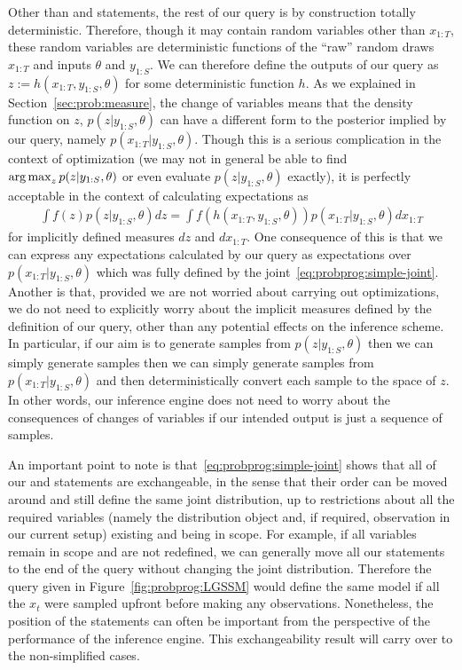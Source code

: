 Other than \sample and \observe statements, the rest of our query is by construction totally deterministic.  Therefore,
though it may contain random variables other than $x_{1:T}$, these random variables are deterministic
functions of the ``raw'' random draws $x_{1:T}$ and inputs $\theta$ and $y_{1:S}$.  We can therefore 
define the outputs of our query as $z := h(x_{1:T},y_{1:S},\theta)$ for some deterministic function $h$.
As we explained in Section~\ref{sec:prob:measure}, the change of variables means that the density function on $z$,
$p(z | y_{1:S}, \theta) $
can have a different form to the posterior implied by our query, namely $p(x_{1:T} | y_{1:S}, \theta)$.
  Though this is a serious complication in the
context of optimization (we may not in general be able to find $\operatorname*{arg\,max}_z p(z|y_{1:S},\theta)$
or even evaluate $p(z | y_{1:S}, \theta)$ exactly), it
is perfectly acceptable in the context of calculating expectations as
\begin{align}
\int f(z) p(z | y_{1:S}, \theta) dz = \int f(h(x_{1:T}, y_{1:S}, \theta)) p(x_{1:T} | y_{1:S}, \theta) dx_{1:T}
\end{align}
for implicitly defined measures $dz$ and $dx_{1:T}$.  One consequence of this is that
we can express any expectations calculated by our query as expectations over $p(x_{1:T} | y_{1:S}, \theta)$
which was fully defined by the joint~\eqref{eq:probprog:simple-joint}.  Another is that, provided we are not worried
about carrying out optimizations, we do not need to explicitly worry about the implicit measures defined
by the definition of our query, other than any potential effects on the inference scheme.  In particular,
if our aim is to generate samples from $p(z | y_{1:S}, \theta)$ then we can simply generate samples then
we can simply generate samples from $p(x_{1:T} | y_{1:S}, \theta)$ and then deterministically convert each
sample to the space of $z$.  In other words, our inference engine does not need to worry about
the consequences of changes of variables if our intended output is just a sequence of samples.

An important point to note is that~\eqref{eq:probprog:simple-joint} shows that all of our \sample
and \observe statements are exchangeable, in the sense that their order can be moved around and
still define the same joint distribution, up to restrictions about all the required variables (namely the
distribution object and, if required, observation in our current setup) existing and being in scope.  
For example, if all variables remain in scope
and are not redefined, we can generally move all our \observe statements to the end of the query
without changing the joint distribution.  Therefore the query given in Figure~\ref{fig:probprog:LGSSM}
would define the same model if all the $x_t$ were sampled upfront before making any observations.
Nonetheless, the position of the \observe statements
can often be important from the perspective of the performance of the inference engine.  This exchangeability
result will carry over to the non-simplified cases.

